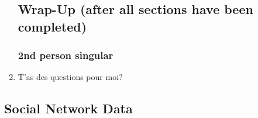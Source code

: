 \begin{enumerate}
\subsection{Wrap-Up (after all sections have been completed)}
  \subsubsection{2nd person singular}
    \item T'as des questions pour moi?\\
  \end{enumerate}

\newpage
\subsection{Social Network Data}
